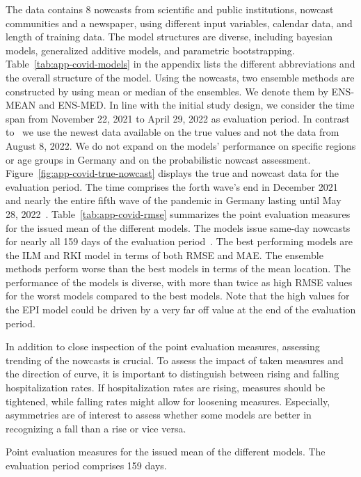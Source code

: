 The data contains 8 nowcasts from scientific and public institutions, nowcast communities and a newspaper, using different input variables, calendar data, and length of training data.
The model structures are diverse, including bayesian models, generalized additive models, and parametric bootstrapping.
Table~\ref{tab:app-covid-models} in the appendix lists the different abbreviations and the overall structure of the model.
Using the nowcasts, two ensemble methods are constructed by using mean or median of the ensembles.
We denote them by ENS-MEAN and ENS-MED.
In line with the initial study design, we consider the time span from November 22, 2021 to April 29, 2022 as evaluation period.
In contrast to~\textcite{Wolffram2023} we use the newest data available on the true values and not the data from August 8, 2022.
We do not expand on the models' performance on specific regions or age groups in Germany and on the probabilistic nowcast assessment.
Figure~\ref{fig:app-covid-true-nowcast} displays the true and nowcast data for the evaluation period.
The time comprises the forth wave's end in December 2021 and nearly the entire fifth wave of the pandemic in Germany lasting until May 28, 2022~\parencite{Tolksdorf2022}.
Table~\ref{tab:app-covid-rmse} summarizes the point evaluation measures for the issued mean of the different models.
The models issue same-day nowcasts for nearly all 159 days of the evaluation period~\parencite[see][Tables A2, A3, and A4]{Wolffram2023}.
The best performing models are the ILM and RKI model in terms of both RMSE and MAE.
The ensemble methods perform worse than the best models in terms of the mean location.
The performance of the models is diverse, with more than twice as high RMSE values for the worst models compared to the best models.
Note that the high values for the EPI model could be driven by a very far off value at the end of the evaluation period.

In addition to close inspection of the point evaluation measures, assessing trending of the nowcasts is crucial.
To assess the impact of taken measures and the direction of curve, it is important to distinguish between rising and falling hospitalization rates.
If hospitalization rates are rising, measures should be tightened, while falling rates might allow for loosening measures.
Especially, asymmetries are of interest to assess whether some models are better in recognizing a fall than a rise or vice versa.

\begin{table}[]
    \centering
    
    \caption{Point evaluation measures for the issued mean of the different models. The evaluation period comprises 159 days. }
    \label{tab:app-covid-rmse}
\end{table}

